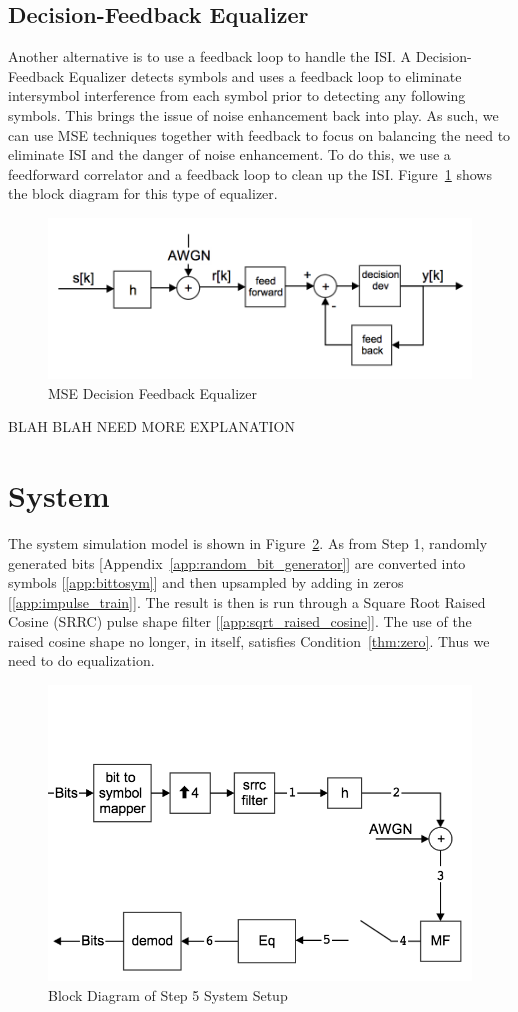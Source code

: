 \documentclass[]{article}
\begin{document}
\subsection{Decision-Feedback Equalizer}
\label{sec:dfe}
Another alternative is to use a feedback loop to handle the ISI.  A Decision-Feedback Equalizer detects symbols and uses a feedback loop to eliminate intersymbol interference from each symbol prior to detecting any following symbols.  This brings the issue of noise enhancement back into play.  As such, we can use MSE techniques together with feedback to focus on balancing the need to eliminate ISI and the danger of noise enhancement.  To do this, we use a feedforward correlator and a feedback loop to clean up the ISI.  Figure~\ref{fig:dfe} shows the block diagram for this type of equalizer.  

\begin{figure}[H]
\centering
\includegraphics[width=.6\textwidth]{mse_dfe.png}
\caption{MSE Decision Feedback Equalizer\label{fig:dfe}}
\end{figure}


BLAH BLAH NEED MORE EXPLANATION

\newpage
\section{System}
\label{sec:system}
The system simulation model is shown in Figure~\ref{fig:step5}.  As from Step 1, randomly generated bits [Appendix~\ref{app:random_bit_generator}] are converted into symbols [\ref{app:bittosym}] and then upsampled by adding in zeros [\ref{app:impulse_train}].  The result is then is run through a Square Root Raised Cosine (SRRC) pulse shape filter [\ref{app:sqrt_raised_cosine}].  The use of the raised cosine shape no longer, in itself, satisfies Condition~\ref{thm:zero}.  Thus we need to do equalization.
\begin{figure}[H]
\centering
\includegraphics[width=.6\textwidth]{step5.png}
\caption{Block Diagram of Step 5 System Setup\label{fig:step5}}
\end{figure}
\end{document}
